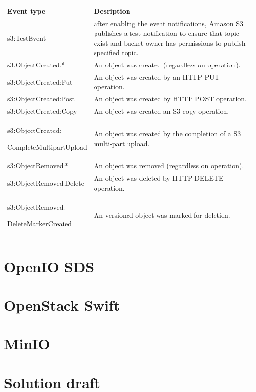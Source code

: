      \renewcommand*{\arraystretch}{1.4}
     \begin{tabularx}{\textwidth}{|p{}|X|}
         \hline
         \textbf{Event type} & \textbf{Desription} \\
         \hline
         s3:TestEvent & after enabling the event notifications, Amazon S3 publishes a test notification to ensure that topic exist and bucket owner has permissions to publish specified topic. \\
         \hline
         s3:ObjectCreated:* & An object was created (regardless on operation). \\
         \hline
         s3:ObjectCreated:Put & An object was created by an HTTP PUT operation. \\
         \hline
         s3:ObjectCreated:Post & An object was created by HTTP POST operation. \\
         \hline
         s3:ObjectCreated:Copy & An object was created an S3 copy operation. \\
         \hline
         s3:ObjectCreated:

         CompleteMultipartUpload & An object was created by the completion of a S3 multi-part upload. \\
         \hline
         s3:ObjectRemoved:* & An object was removed (regardless on operation). \\
         \hline
         s3:ObjectRemoved:Delete & An object was deleted by HTTP DELETE operation. \\
         \hline
         s3:ObjectRemoved:

         DeleteMarkerCreated & An versioned object was marked for deletion. \\
         \hline
    \end{tabularx}


\chapter{OpenIO SDS}
\chapter{OpenStack Swift}
\chapter{MinIO}

\chapter{Solution draft}
